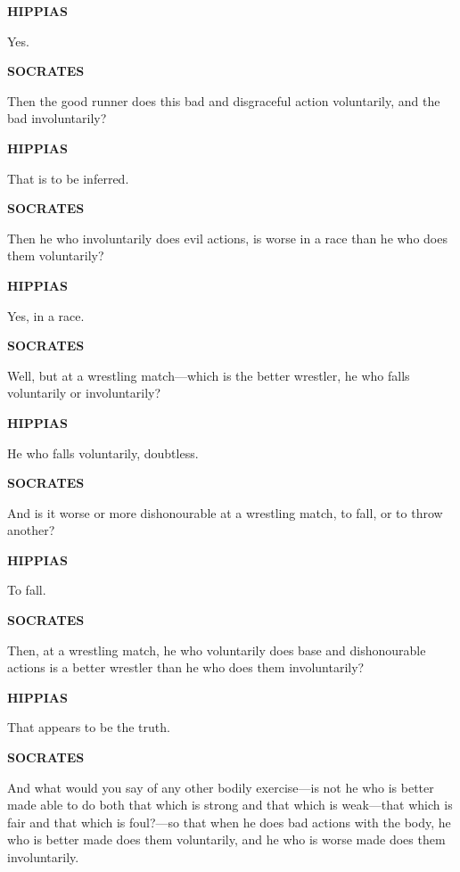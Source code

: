 \documentclass[11pt,letter]{article}
\begin{document}
\par \textbf{HIPPIAS}
\par   Yes.

\par \textbf{SOCRATES}
\par   Then the good runner does this bad and disgraceful action voluntarily, and the bad involuntarily?

\par \textbf{HIPPIAS}
\par   That is to be inferred.

\par \textbf{SOCRATES}
\par   Then he who involuntarily does evil actions, is worse in a race than he who does them voluntarily?

\par \textbf{HIPPIAS}
\par   Yes, in a race.

\par \textbf{SOCRATES}
\par   Well, but at a wrestling match—which is the better wrestler, he who falls voluntarily or involuntarily?

\par \textbf{HIPPIAS}
\par   He who falls voluntarily, doubtless.

\par \textbf{SOCRATES}
\par   And is it worse or more dishonourable at a wrestling match, to fall, or to throw another?

\par \textbf{HIPPIAS}
\par   To fall.

\par \textbf{SOCRATES}
\par   Then, at a wrestling match, he who voluntarily does base and dishonourable actions is a better wrestler than he who does them involuntarily?

\par \textbf{HIPPIAS}
\par   That appears to be the truth.

\par \textbf{SOCRATES}
\par   And what would you say of any other bodily exercise—is not he who is better made able to do both that which is strong and that which is weak—that which is fair and that which is foul?—so that when he does bad actions with the body, he who is better made does them voluntarily, and he who is worse made does them involuntarily.
\end{document}
